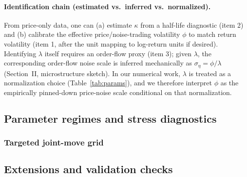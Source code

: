 \paragraph{Identification chain (estimated vs.\ inferred vs.\ normalized).}
From price-only data, one can (a) estimate $\kappa$ from a half-life diagnostic (item 2) and (b) calibrate the effective price/noise-trading volatility $\phi$ to match return volatility (item 1, after the unit mapping to log-return units if desired).
Identifying $\lambda$ itself requires an order-flow proxy (item 3); given $\lambda$, the corresponding order-flow noise scale is inferred mechanically as $\sigma_\eta=\phi/\lambda$ (Section~II, microstructure sketch).
In our numerical work, $\lambda$ is treated as a normalization choice (Table~\ref{tab:params}), and we therefore interpret $\phi$ as the empirically pinned-down price-noise scale conditional on that normalization.

\subsection{Parameter regimes and stress diagnostics}
\label{sec:meaningful_regions}

\label{tab:price_filter}
\label{tab:mispricing_stress}

\subsubsection{Targeted joint-move grid}
\label{subsec:joint_grid}

\subsection{Extensions and validation checks}
\label{subsec:extensions}
